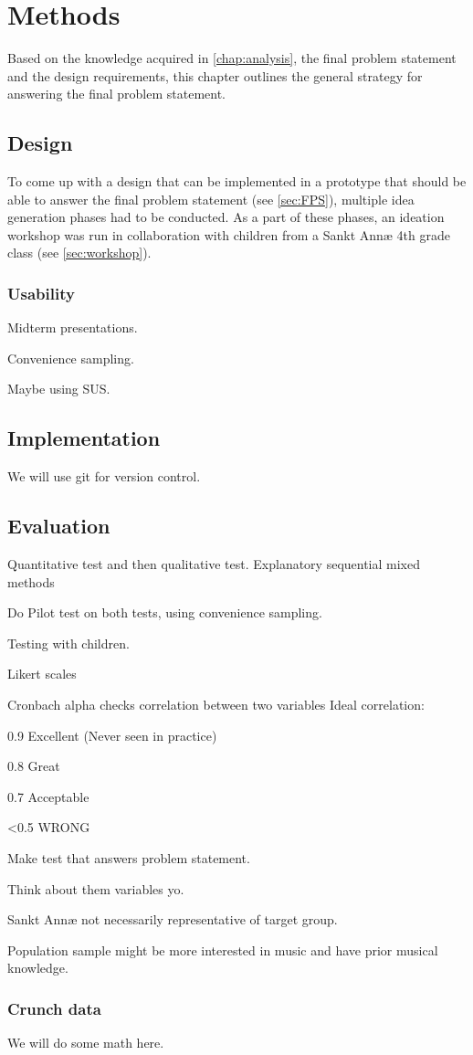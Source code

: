 \chapter{Methods}
Based on the knowledge acquired in \autoref{chap:analysis}, the final problem statement and the design requirements, this chapter outlines the general strategy for answering the final problem statement.
\section{Design}
To come up with a design that can be implemented in a prototype that should be able to answer the final problem statement (see \autoref{sec:FPS}), multiple idea generation phases had to be conducted. As a part of these phases, an ideation workshop was run in collaboration with children from a Sankt Annæ 4th grade class (see \autoref{sec:workshop}).
\subsection{Usability}
Midterm presentations.

Convenience sampling.

Maybe using SUS.
\section{Implementation}
We will use git for version control.
\section{Evaluation}
Quantitative test and then qualitative test.
Explanatory sequential mixed methods\cite[p.~21]{bjoernerBog}

Do Pilot test on both tests, using convenience sampling.

Testing with children\cite[p.~207]{bjoernerBog}.

Likert scales

Cronbach alpha checks correlation between two variables
Ideal correlation:

0.9 Excellent (Never seen in practice)

0.8 Great

0.7 Acceptable

<0.5 WRONG

Make test that answers problem statement.

Think about them variables yo.

Sankt Annæ not necessarily representative of target group.

Population sample might be more interested in music and have prior musical knowledge.

\subsection{Crunch data}
	We will do some math here.\cite{nyBog}